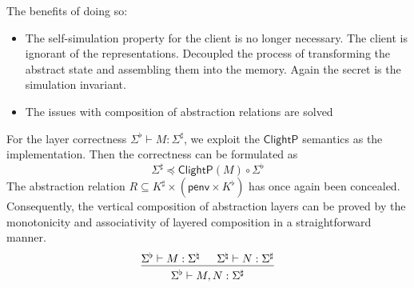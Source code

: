 \documentclass[acmsmall,screen,review,anonymous]{acmart}
\newcommand{\kw}[1]{\ensuremath{ \mathsf{#1} }}
\renewcommand{\preceq}{\preccurlyeq}
\newcommand{\ClightP}{\ensuremath{\mathsf{ClightP}}}
\begin{document}
The benefits of doing so:
\begin{itemize}
\item The self-simulation property for the client is no longer necessary.
  The client is ignorant of the representations.
  Decoupled the process of transforming the abstract state
  and assembling them into the memory.
  Again the secret is the simulation invariant.
\item The issues with composition of abstraction relations are solved
\end{itemize}

For the layer correctness $\Sigma^\flat \vdash M : \Sigma^\sharp$,
we exploit the $\kw{\ClightP}$ semantics as the implementation.
Then the correctness can be formulated as
\[
  \Sigma^\sharp \preceq \ClightP(M) \circ \Sigma^\flat
\]
The abstraction relation
$R \subseteq K^\sharp \times (\kw{penv} \times K^\flat)$
has once again been concealed.
Consequently, the vertical composition of abstraction layers
can be proved
by the monotonicity and associativity of layered composition
in a straightforward manner.
\[
  \begin{prooftree}
    \hypo{\Sigma^\flat \vdash M : \Sigma^\natural}
    \hypo{\Sigma^\natural \vdash N : \Sigma^\sharp}
    \infer2{\Sigma^\flat \vdash M, N : \Sigma^\sharp}
  \end{prooftree}
\]
\end{document}
